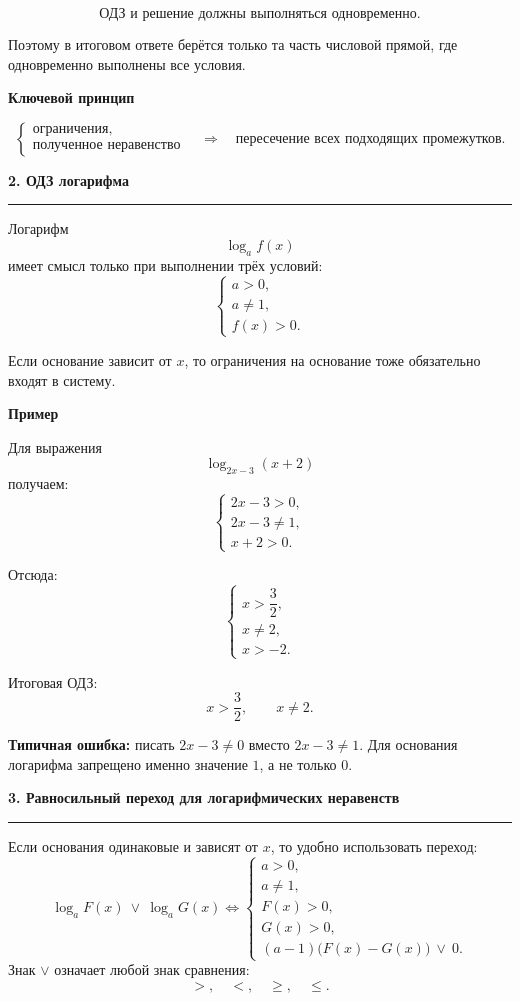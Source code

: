 \documentclass[a4paper,12pt]{article}
\newcommand{\SectionTitle}[1]{%
  \vspace{0.8em}
  {\Large\bfseries\textcolor{darkaccent}{#1}}\par
  \vspace{0.2em}
  {\color{accent}\rule{\linewidth}{0.8pt}}
  \vspace{0.4em}
}
\newcommand{\MiniTitle}[1]{%
  \vspace{0.45em}
  {\bfseries\textcolor{darkaccent}{#1}}\par
}
\newcommand{\Important}[1]{%
  \textcolor{darkaccent}{\bfseries #1}
}
\begin{document}
\[
\text{ОДЗ и решение должны выполняться одновременно.}
\]

Поэтому в итоговом ответе берётся только та часть числовой прямой, где одновременно выполнены все условия.

\MiniTitle{Ключевой принцип}

\[
\begin{cases}
\text{ограничения},\\
\text{полученное неравенство}
\end{cases}
\quad
\Longrightarrow
\quad
\text{пересечение всех подходящих промежутков.}
\]

\SectionTitle{2. ОДЗ логарифма}

Логарифм
\[
\log_a f(x)
\]
имеет смысл только при выполнении трёх условий:
\[
\boxed{
\begin{cases}
a>0,\\
a\ne 1,\\
f(x)>0.
\end{cases}
}
\]

Если основание зависит от \(x\), то ограничения на основание тоже обязательно входят в систему.

\MiniTitle{Пример}

Для выражения
\[
\log_{2x-3}(x+2)
\]
получаем:
\[
\begin{cases}
2x-3>0,\\
2x-3\ne 1,\\
x+2>0.
\end{cases}
\]

Отсюда:
\[
\begin{cases}
x>\dfrac32,\\
x\ne 2,\\
x>-2.
\end{cases}
\]

Итоговая ОДЗ:
\[
x>\dfrac32,\qquad x\ne 2.
\]

\Important{Типичная ошибка:} писать \(2x-3\ne0\) вместо \(2x-3\ne1\). Для основания логарифма запрещено именно значение \(1\), а не только \(0\).

\SectionTitle{3. Равносильный переход для логарифмических неравенств}

Если основания одинаковые и зависят от \(x\), то удобно использовать переход:
\[
\boxed{
\log_a F(x)\ \vee\ \log_a G(x)
\Longleftrightarrow
\begin{cases}
a>0,\\
a\ne1,\\
F(x)>0,\\
G(x)>0,\\
(a-1)\bigl(F(x)-G(x)\bigr)\ \vee\ 0.
\end{cases}
}
\]
Знак \(\vee\) означает любой знак сравнения:
\[
>,\quad <,\quad \ge,\quad \le.
\]
\end{document}
